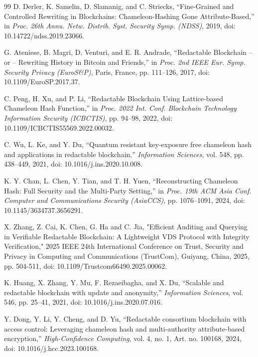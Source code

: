 \documentclass[lettersize,journal]{IEEEtran}
\begin{document}
\begin{thebibliography}{99}
    D. Derler, K. Samelin, D. Slamanig, and C. Striecks,
    ``Fine-Grained and Controlled Rewriting in Blockchains: Chameleon-Hashing Gone Attribute-Based,''
    in \textit{Proc. 26th Annu. Netw. Distrib. Syst. Security Symp. (NDSS)}, 2019,
    doi: 10.14722/ndss.2019.23066.
    
    G. Ateniese, B. Magri, D. Venturi, and E. R. Andrade,
    ``Redactable Blockchain -- or -- Rewriting History in Bitcoin and Friends,''
    in \textit{Proc. 2nd IEEE Eur. Symp. Security Privacy (EuroS\&P)},
    Paris, France, pp. 111--126, 2017,
    doi: 10.1109/EuroSP.2017.37.
    
    C. Peng, H. Xu, and P. Li,
    ``Redactable Blockchain Using Lattice-based Chameleon Hash Function,''
    in \textit{Proc. 2022 Int. Conf. Blockchain Technology Information Security (ICBCTIS)},
    pp. 94--98, 2022,
    doi: 10.1109/ICBCTIS55569.2022.00032.
    
    C. Wu, L. Ke, and Y. Du,
    ``Quantum resistant key-exposure free chameleon hash and applications in redactable blockchain,''
    \textit{Information Sciences}, vol. 548, pp. 438--449, 2021,
    doi: 10.1016/j.ins.2020.10.008.
    
    K. Y. Chan, L. Chen, Y. Tian, and T. H. Yuen,
    ``Reconstructing Chameleon Hash: Full Security and the Multi-Party Setting,''
    in \textit{Proc. 19th ACM Asia Conf. Computer and Communications Security (AsiaCCS)},
    pp. 1076--1091, 2024,
    doi: 10.1145/3634737.3656291.
    
    X. Zhang, Z. Cai, K. Chen, G. Ha and C. Jia, "Efficient Auditing and Querying in Verifiable Redactable Blockchain: A Lightweight VDS Protocol with Integrity Verification," 2025 IEEE 24th International Conference on Trust, Security and Privacy in Computing and Communications (TrustCom), Guiyang, China, 2025, pp. 504-511, doi: 10.1109/Trustcom66490.2025.00062.
    
    K. Huang, X. Zhang, Y. Mu, F. Rezaeibagha, and X. Du,
    ``Scalable and redactable blockchain with update and anonymity,''
    \textit{Information Sciences}, vol. 546, pp. 25--41, 2021,
    doi: 10.1016/j.ins.2020.07.016.
    
    Y. Dong, Y. Li, Y. Cheng, and D. Yu,
    ``Redactable consortium blockchain with access control: Leveraging chameleon hash and multi-authority attribute-based encryption,''
    \textit{High-Confidence Computing}, vol. 4, no. 1, Art. no. 100168, 2024,
    doi: 10.1016/j.hcc.2023.100168.
    

\end{thebibliography}
\end{document}

